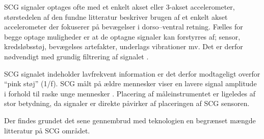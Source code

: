 SCG signaler optages ofte med et enkelt akset eller 3-akset accelerometer, størstedelen af den fundne litteratur beskriver brugen af et enkelt akset accelerometer der fokuserer på bevægelser i dorso–ventral retning. Fælles for begge optage muligheder er at de optagne signaler kan forstyrres af; sensor, kredsløbsstøj, bevægelses artefakter, underlags vibrationer mv. Det er derfor nødvendigt med grundig filtrering af signalet \cite{Recent_Advances}.


SCG signalet indeholder lavfrekvent information er det derfor modtageligt overfor “pink støj” (1/f). SCG målt på ældre mennesker viser en lavere signal amplitude i forhold til raske unge mennesker \cite{Recent_Advances}. Placering af måleinstrumentet er ligeledes af stor betydning, da signaler er direkte påvirker af placeringen af SCG sensoren.


Der findes grundet det sene gennembrud med teknologien en begrænset mængde litteratur på SCG området.